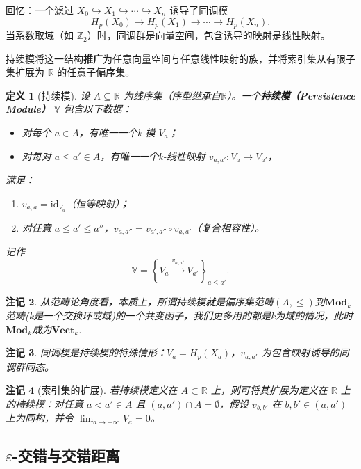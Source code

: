 \documentclass[UTF8]{ctexart}
\newtheorem{definition}{定义}[section]
\newtheorem{remark}[definition]{注记}
\begin{document}
回忆：一个滤过 \(X_0 \hookrightarrow X_1 \hookrightarrow \cdots \hookrightarrow X_n\) 诱导了同调模
\[
H_p(X_0) \to H_p(X_1) \to \cdots \to H_p(X_n).
\]
当系数取域（如 \(\mathbb{Z}_2\)）时，同调群是向量空间，包含诱导的映射是线性映射。

持续模将这一结构\textbf{推广}为任意向量空间与任意线性映射的族，并将索引集从有限子集扩展为 \(\mathbb{R}\) 的任意子偏序集。

\begin{definition}[持续模]
\label{def:persistence-module}
设 \(A \subseteq \mathbb{R}\) 为线序集（序型继承自$\mathbb{R}$）。一个\textbf{持续模（Persistence Module）} \(\mathbb{V}\) 包含以下数据：
\begin{itemize}
    \item 对每个 \(a \in A\)，有唯一一个k-模 \(V_a\)；
    \item 对每对 \(a \le a' \in A\)，有唯一一个k-线性映射 \(v_{a,a'}: V_a \to V_{a'}\)，
\end{itemize}
满足：
\begin{enumerate}
    \item \(v_{a,a} = \mathrm{id}_{V_a}\)（恒等映射）；
    \item 对任意 \(a \le a' \le a''\)，\(v_{a,a''} = v_{a',a''} \circ v_{a,a'}\)（复合相容性）。
\end{enumerate}
记作
\[
\mathbb{V} = \left\{ V_a \xrightarrow{v_{a,a'}} V_{a'} \right\}_{a \le a'}.
\]
\end{definition}

\begin{remark}
从范畴论角度看，本质上，所谓持续模就是偏序集范畴$(A,\leq)$到$\textbf{Mod}_{k}$范畴(k是一个交换环或域)的一个共变函子，我们更多用的都是k为域的情况，此时$\textbf{Mod}_{k}$成为$\textbf{Vect}_{k}$.
\end{remark}

\begin{remark}
同调模是持续模的特殊情形：\(V_a = H_p(X_a)\)，\(v_{a,a'}\) 为包含映射诱导的同调群同态。
\end{remark}

\begin{remark}[索引集的扩展]
若持续模定义在 \(A \subset \mathbb{R}\) 上，则可将其扩展为定义在 \(\mathbb{R}\) 上的持续模：对任意 \(a < a' \in A\) 且 \((a,a') \cap A = \emptyset\)，假设 \(v_{b,b'}\) 在 \(b,b' \in (a,a')\) 上为同构，并令 \(\lim_{a \to -\infty} V_a = 0\)。
\end{remark}

\subsection{\(\varepsilon\)-交错与交错距离}
\label{subsec:interleaving}
\end{document}
